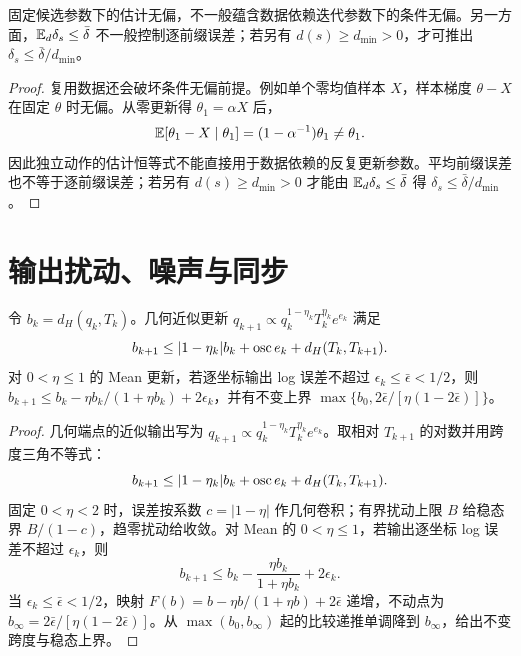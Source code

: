 \begin{proposition}[数据复用与平均覆盖的两个限制]
固定候选参数下的估计无偏，不一般蕴含数据依赖迭代参数下的条件无偏。另一方面，$\mathbb E_d\delta_s\le\bar\delta$ 不一般控制逐前缀误差；若另有 $d(s)\ge d_{\min}>0$，才可推出 $\delta_s\le\bar\delta/d_{\min}$。
\end{proposition}
\begin{proof}
复用数据还会破坏条件无偏前提。例如单个零均值样本 $X$，样本梯度 $\theta-X$ 在固定 $\theta$ 时无偏。从零更新得 $\theta_1=\alpha X$ 后，
\begin{equation}
\mathbb E[\theta_1-X\mid\theta_1]=(1-\alpha^{-1})\theta_1\ne\theta_1.
\end{equation}
因此独立动作的估计恒等式不能直接用于数据依赖的反复更新参数。平均前缀误差也不等于逐前缀误差；若另有 $d(s)\ge d_{\min}>0$ 才能由 $\mathbb E_d\delta_s\le\bar\delta$ 得 $\delta_s\le\bar\delta/d_{\min}$。
\end{proof}

\section{输出扰动、噪声与同步}
\begin{theorem}[确定性输出扰动的跨度递推]
令 $b_k=d_H(q_k,T_k)$。几何近似更新 $q_{k+1}\propto q_k^{1-\eta_k}T_k^{\eta_k}e^{e_k}$ 满足
\begin{equation}
b_{k+1}\le|1-\eta_k|b_k+\operatorname{osc} e_k+d_H(T_k,T_{k+1}).
\end{equation}
对 $0<\eta\le1$ 的 Mean 更新，若逐坐标输出 log 误差不超过 $\epsilon_k\le\bar\epsilon<1/2$，则 $b_{k+1}\le b_k-\eta b_k/(1+\eta b_k)+2\epsilon_k$，并有不变上界 $\max\{b_0,2\bar\epsilon/[\eta(1-2\bar\epsilon)]\}$。
\end{theorem}
\begin{proof}
几何端点的近似输出写为 $q_{k+1}\propto q_k^{1-\eta_k}T_k^{\eta_k}e^{e_k}$。取相对 $T_{k+1}$ 的对数并用跨度三角不等式：
\begin{equation}
b_{k+1}\le|1-\eta_k|b_k+\operatorname{osc} e_k+d_H(T_k,T_{k+1}).
\end{equation}
固定 $0<\eta<2$ 时，误差按系数 $c=|1-\eta|$ 作几何卷积；有界扰动上限 $B$ 给稳态界 $B/(1-c)$，趋零扰动给收敛。对 Mean 的 $0<\eta\le1$，若输出逐坐标 log 误差不超过 $\epsilon_k$，则
\begin{equation}
b_{k+1}\le b_k-\frac{\eta b_k}{1+\eta b_k}+2\epsilon_k.
\end{equation}
当 $\epsilon_k\le\bar\epsilon<1/2$，映射 $F(b)=b-\eta b/(1+\eta b)+2\bar\epsilon$ 递增，不动点为 $b_\infty=2\bar\epsilon/[\eta(1-2\bar\epsilon)]$。从 $\max(b_0,b_\infty)$ 起的比较递推单调降到 $b_\infty$，给出不变跨度与稳态上界。
\end{proof}

